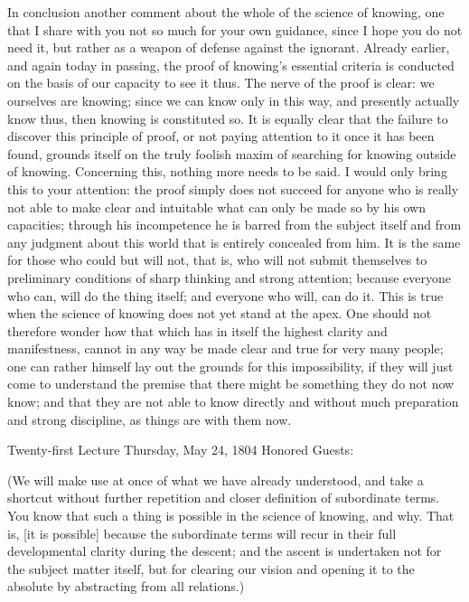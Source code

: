 In conclusion another comment about
the whole of the science of knowing,
one that I share with you not so much for your own guidance,
since I hope you do not need it,
but rather as a weapon of defense against the ignorant.
Already earlier, and again today in passing,
the proof of knowing's essential criteria is conducted
on the basis of our capacity to see it thus.
The nerve of the proof is clear:
we ourselves are knowing;
since we can know only in this way,
and presently actually know thus,
then knowing is constituted so.
It is equally clear that the failure
to discover this principle of proof,
or not paying attention to it once it has been found,
grounds itself on the truly foolish maxim
of searching for knowing outside of knowing.
Concerning this, nothing more needs to be said.
I would only bring this to your attention:
the proof simply does not succeed for anyone
who is really not able to make clear and intuitable
what can only be made so by his own capacities;
through his incompetence he is
barred from the subject itself
and from any judgment about this world
that is entirely concealed from him.
It is the same for those who could but will not, that is,
who will not submit themselves to preliminary conditions
of sharp thinking and strong attention;
because everyone who can, will do the thing itself;
and everyone who will, can do it.
This is true when the science of knowing
does not yet stand at the apex.
One should not therefore wonder
how that which has in itself
the highest clarity and manifestness,
cannot in any way be made clear and true
for very many people;
one can rather himself lay out
the grounds for this impossibility,
if they will just come to understand the premise
that there might be something they do not now know;
and that they are not able to know directly
and without much preparation and strong discipline,
as things are with them now.

Twenty-first Lecture
Thursday, May 24, 1804
Honored Guests:

(We will make use at once of what we have already understood,
and take a shortcut without further repetition
and closer definition of subordinate terms.
You know that such a thing is possible
in the science of knowing, and why.
That is, [it is possible] because
the subordinate terms will recur
in their full developmental clarity during the descent;
and the ascent is undertaken not for the subject matter itself,
but for clearing our vision
and opening it to the absolute
by abstracting from all relations.)

